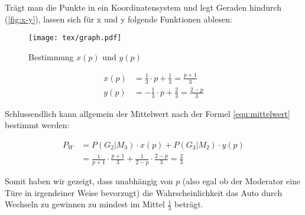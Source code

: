 Trägt man die Punkte in ein Koordinatensystem und legt Geraden hindurch (\autoref{fig:x-y}), lassen sich für x und y folgende Funktionen ablesen:

\begin{figure}[hbtp]
    \centering
    \captionsetup{name=Abb., justification=centering, format=nolinebreak}
    \texttt{[image: tex/graph.pdf]}
    \caption{Bestimmung $x(p)$ und $y(p)$} \label{fig:x-y}
\end{figure}

\begin{align*}
    x(p) & = \frac{1}{3} \cdot p + \frac{1}{3} = \frac{p + 1}{3} \\
    y(p) & = -\frac{1}{3} \cdot p + \frac{2}{3} = \frac{2-p}{3}
\end{align*}

Schlussendlich kann allgemein der Mittelwert nach der Formel \ref{equ:mittelwert} bestimmt werden:

\begin{align*}
    P_W & = P(G_2 | M_3) \cdot x(p) + P(G_3 | M_2) \cdot y(p)                                       \\
        & = \frac{1}{p+1} \cdot \frac{p + 1}{3} + \frac{1}{2-p} \cdot \frac{2 - p}{3} = \frac{2}{3}
\end{align*}

Somit haben wir gezeigt, dass unabhängig von $p$ (also egal ob der Moderator eine Türe in irgendeiner Weise bevorzugt) die Wahrscheinlichkeit das Auto durch Wechseln zu gewinnen zu mindest im Mittel $\frac{1}{3}$ beträgt.
